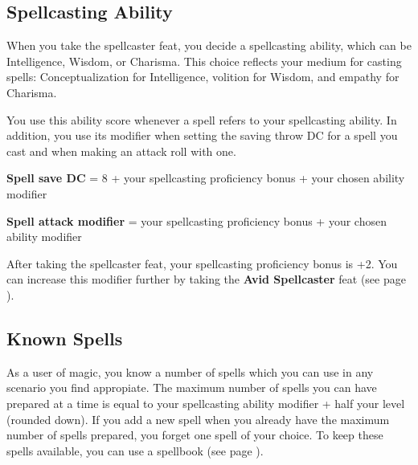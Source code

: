 



\subsection*{Spellcasting Ability}
    When you take the spellcaster feat, you decide a spellcasting ability, which can be Intelligence, Wisdom, or Charisma.
    This choice reflects your medium for casting spells: Conceptualization for Intelligence, volition for Wisdom, and empathy for Charisma.

    You use this ability score whenever a spell refers to your spellcasting ability.
    In addition, you use its modifier when setting the saving throw DC for a spell you cast and when making an attack roll with one.

    \textbf{Spell save DC} = 8 + your spellcasting proficiency bonus + your chosen ability modifier

    \textbf{Spell attack modifier} = your spellcasting proficiency bonus + your chosen ability modifier

    After taking the spellcaster feat, your spellcasting proficiency bonus is +2.
    You can increase this modifier further by taking the \textbf{Avid Spellcaster} feat (see page \pageref{feat::avidspellcaster}).

\subsection*{Known Spells}
    As a user of magic, you know a number of spells which you can use in any scenario you find appropiate.
    The maximum number of spells you can have prepared at a time is equal to your spellcasting ability modifier + half your level (rounded down).
    If you add a new spell when you already have the maximum number of spells prepared, you forget one spell of your choice.
    To keep these spells available, you can use a spellbook (see page \pageref{item::spellbook}).

